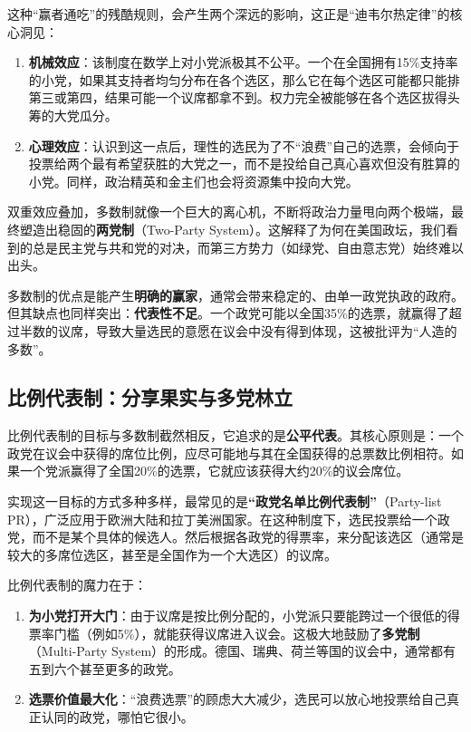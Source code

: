 \documentclass[a5paper, 11pt, openany]{ctexbook}
\begin{document}
这种“赢者通吃”的残酷规则，会产生两个深远的影响，这正是“迪韦尔热定律”的核心洞见：
\begin{enumerate}
    \item \textbf{机械效应}：该制度在数学上对小党派极其不公平。一个在全国拥有15\%支持率的小党，如果其支持者均匀分布在各个选区，那么它在每个选区可能都只能排第三或第四，结果可能一个议席都拿不到。权力完全被能够在各个选区拔得头筹的大党瓜分。
    \item \textbf{心理效应}：认识到这一点后，理性的选民为了不“浪费”自己的选票，会倾向于投票给两个最有希望获胜的大党之一，而不是投给自己真心喜欢但没有胜算的小党。同样，政治精英和金主们也会将资源集中投向大党。
\end{enumerate}

双重效应叠加，多数制就像一个巨大的离心机，不断将政治力量甩向两个极端，最终塑造出稳固的\textbf{两党制}（Two-Party System）。这解释了为何在美国政坛，我们看到的总是民主党与共和党的对决，而第三方势力（如绿党、自由意志党）始终难以出头。

多数制的优点是能产生\textbf{明确的赢家}，通常会带来稳定的、由单一政党执政的政府。但其缺点也同样突出：\textbf{代表性不足}。一个政党可能以全国35\%的选票，就赢得了超过半数的议席，导致大量选民的意愿在议会中没有得到体现，这被批评为“人造的多数”。

\subsection{比例代表制：分享果实与多党林立}

比例代表制的目标与多数制截然相反，它追求的是\textbf{公平代表}。其核心原则是：一个政党在议会中获得的席位比例，应尽可能地与其在全国获得的总票数比例相符。如果一个党派赢得了全国20\%的选票，它就应该获得大约20\%的议会席位。

实现这一目标的方式多种多样，最常见的是\textbf{“政党名单比例代表制”}（Party-list PR），广泛应用于欧洲大陆和拉丁美洲国家。在这种制度下，选民投票给一个政党，而不是某个具体的候选人。然后根据各政党的得票率，来分配该选区（通常是较大的多席位选区，甚至是全国作为一个大选区）的议席。

比例代表制的魔力在于：
\begin{enumerate}
    \item \textbf{为小党打开大门}：由于议席是按比例分配的，小党派只要能跨过一个很低的得票率门槛（例如5\%），就能获得议席进入议会。这极大地鼓励了\textbf{多党制}（Multi-Party System）的形成。德国、瑞典、荷兰等国的议会中，通常都有五到六个甚至更多的政党。
    \item \textbf{选票价值最大化}：“浪费选票”的顾虑大大减少，选民可以放心地投票给自己真正认同的政党，哪怕它很小。
\end{enumerate}
\end{document}
